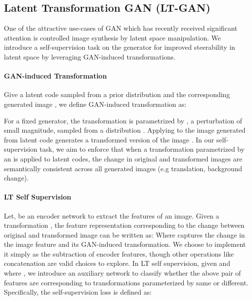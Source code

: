 \documentclass[10pt,twocolumn,letterpaper]{article}
\begin{document}
\subsection{Latent Transformation GAN (LT-GAN)}
One of the attractive use-cases of GAN which has recently received significant attention is controlled image synthesis by latent space manipulation. We introduce a self-supervision task on the generator for improved steerability in latent space by leveraging GAN-induced transformations. 

\vspace{-11pt}
\paragraph{GAN-induced Transformation}
Give a latent code  sampled from a prior distribution  and the corresponding generated image , we define GAN-induced transformation as:



For a fixed generator, the transformation  is parametrized by , a perturbation of small magnitude, sampled from a distribution . Applying  to the image  generated from latent code  generates a transformed version of the image . In our self-supervision task, we aim to enforce that when a transformation  parametrized by an  is applied to latent codes, the change in original and transformed images are semantically consistent across all generated images (e.g translation, background change).







\vspace{-8pt}
\paragraph{LT Self Supervision} 
Let,  be an encoder network to extract the features of an image. Given a transformation , the feature representation corresponding to the change between original and transformed image can be written as:
\label{eq:change_in_t}
Where  captures the change in the image feature and its GAN-induced transformation. We choose to implement it simply as the subtraction of encoder features, though other operations like concatenation are valid choices to explore. In LT self supervision, given  and  where , we introduce an auxiliary network  to classify whether the above pair of features  are corresponding to transformations parameterized by same  or different. Specifically, the self-supervision loss is defined as: 
\end{document}
